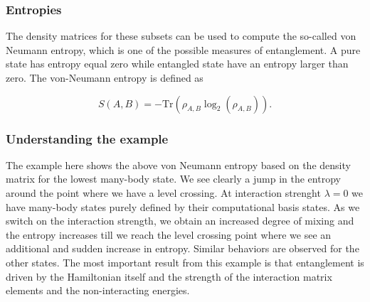 \documentclass{beamer}
\begin{document}
\begin{frame}
\frametitle{Entropies}

The density matrices for these subsets can be used to compute the
so-called von Neumann entropy, which is one of the possible measures
of entanglement. A pure state has entropy equal zero while entangled
state have an entropy larger than zero. The von-Neumann entropy is
defined as

\[
S(A,B)=-\mathrm{Tr}\left(\rho_{A,B}\log_2 (\rho_{A,B})\right).
\]
\end{frame}

\begin{frame}
\frametitle{Understanding the example}

The example here shows the above von Neumann entropy based on the
density matrix for the lowest many-body state. We see clearly a jump
in the entropy around the point where we have a level crossing. At
interaction strenght $\lambda=0$ we have many-body states purely
defined by their computational basis states. As we switch on the
interaction strength, we obtain an increased degree of mixing and the
entropy increases till we reach the level crossing point where we see
an additional and sudden increase in entropy. Similar behaviors are
observed for the other states. The most important result from this
example is that entanglement is driven by the Hamiltonian itself and
the strength of the interaction matrix elements and the
non-interacting energies.
\end{frame}
\end{document}
